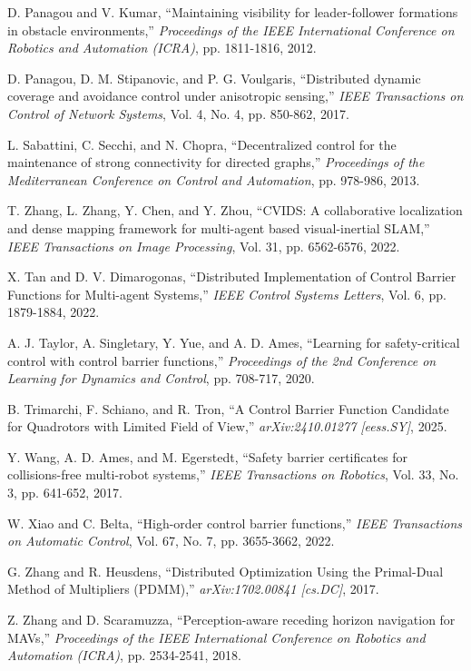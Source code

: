 \begin{thebibliography}{99}
 D. Panagou and V. Kumar, ``Maintaining visibility for leader-follower formations in obstacle environments,'' {\it Proceedings of the IEEE International Conference on Robotics and Automation (ICRA)}, pp. 1811-1816, 2012.

 D. Panagou, D. M. Stipanovic, and P. G. Voulgaris, ``Distributed dynamic coverage and avoidance control under anisotropic sensing,'' {\it IEEE Transactions on Control of Network Systems}, Vol. 4, No. 4, pp. 850-862, 2017.

 L. Sabattini, C. Secchi, and N. Chopra, ``Decentralized control for the maintenance of strong connectivity for directed graphs,'' {\it Proceedings of the Mediterranean Conference on Control and Automation}, pp. 978-986, 2013.

 T. Zhang, L. Zhang, Y. Chen, and Y. Zhou, ``CVIDS: A collaborative localization and dense mapping framework for multi-agent based visual-inertial SLAM,'' {\it IEEE Transactions on Image Processing}, Vol. 31, pp. 6562-6576, 2022.

 X. Tan and D. V. Dimarogonas, ``Distributed Implementation of Control Barrier Functions for Multi-agent Systems,'' {\it IEEE Control Systems Letters}, Vol. 6, pp. 1879-1884, 2022.

 A. J. Taylor, A. Singletary, Y. Yue, and A. D. Ames, ``Learning for safety-critical control with control barrier functions,'' {\it Proceedings of the 2nd Conference on Learning for Dynamics and Control}, pp. 708-717, 2020.

 B. Trimarchi, F. Schiano, and R. Tron, ``A Control Barrier Function Candidate for Quadrotors with Limited Field of View,'' {\it arXiv:2410.01277 [eess.SY]}, 2025.

 Y. Wang, A. D. Ames, and M. Egerstedt, ``Safety barrier certificates for collisions-free multi-robot systems,'' {\it IEEE Transactions on Robotics}, Vol. 33, No. 3, pp. 641-652, 2017.

 W. Xiao and C. Belta, ``High-order control barrier functions,'' {\it IEEE Transactions on Automatic Control}, Vol. 67, No. 7, pp. 3655-3662, 2022.

 G. Zhang and R. Heusdens, ``Distributed Optimization Using the Primal-Dual Method of Multipliers (PDMM),'' {\it arXiv:1702.00841 [cs.DC]}, 2017.


 Z. Zhang and D. Scaramuzza, ``Perception-aware receding horizon navigation for MAVs,'' {\it Proceedings of the IEEE International Conference on Robotics and Automation (ICRA)}, pp. 2534-2541, 2018.
\end{thebibliography}
